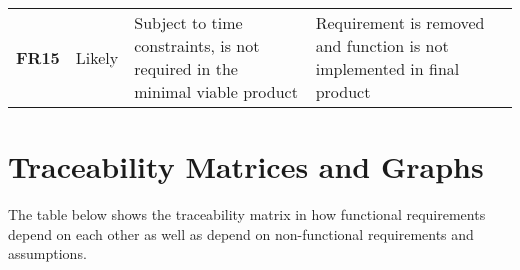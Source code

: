 \documentclass[12pt]{article}
\begin{document}
\begin{table}[H]
\begin{tabular}{|l|p{}|p{}|p{}|l}
\textbf{FR15}                               & Likely                                           & Subject to time constraints, is not required in the minimal viable product                                            & Requirement is removed and function is not implemented in final product &  \\ \cline{1-4}
\end{tabular}
\end{table}

\newpage
\section{Traceability Matrices and Graphs}
The table below shows the traceability matrix in how functional requirements depend on each other as well as depend on non-functional requirements and assumptions.
\end{document}
